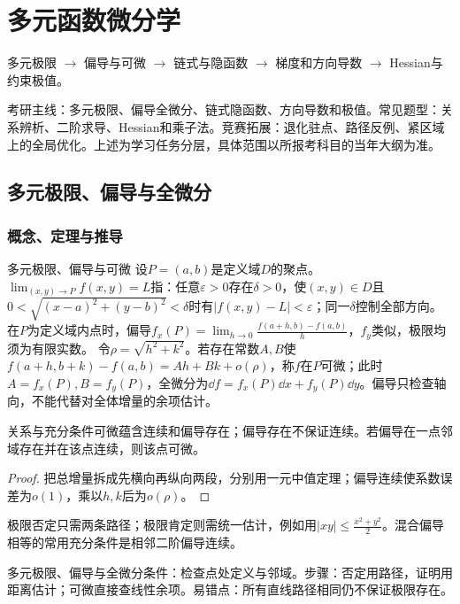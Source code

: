 \chapter{多元函数微分学}\label{ch:6}
\begin{tcolorbox}[title=章首知识地图,colframe=Ink]
多元极限 $\to$ 偏导与可微 $\to$ 链式与隐函数 $\to$ 梯度和方向导数 $\to$ Hessian与约束极值。
\end{tcolorbox}
\begin{examtip}考研主线：多元极限、偏导全微分、链式隐函数、方向导数和极值。常见题型：关系辨析、二阶求导、Hessian和乘子法。竞赛拓展：退化驻点、路径反例、紧区域上的全局优化。上述为学习任务分层，具体范围以所报考科目的当年大纲为准。\end{examtip}
\section{多元极限、偏导与全微分}\label{sec:6:1}
\subsection{概念、定理与推导}

\begin{definition}{多元极限、偏导与可微}
设$P=(a,b)$是定义域$D$的聚点。$\lim_{(x,y)\to P}f(x,y)=L$指：任意$\varepsilon>0$存在$\delta>0$，使$(x,y)\in D$且$0<\sqrt{(x-a)^2+(y-b)^2}<\delta$时有$|f(x,y)-L|<\varepsilon$；同一$\delta$控制全部方向。
在$P$为定义域内点时，偏导$f_x(P)=\lim_{h\to0}\frac{f(a+h,b)-f(a,b)}{h}$，$f_y$类似，极限均须为有限实数。
令$\rho=\sqrt{h^2+k^2}$。若存在常数$A,B$使
$f(a+h,b+k)-f(a,b)=Ah+Bk+o(\rho)$，称$f$在$P$可微；此时$A=f_x(P),B=f_y(P)$，全微分为$\dd f=f_x(P)\dd x+f_y(P)\dd y$。偏导只检查轴向，不能代替对全体增量的余项估计。
\end{definition}
\begin{theorem}{关系与充分条件}可微蕴含连续和偏导存在；偏导存在不保证连续。若偏导在一点邻域存在并在该点连续，则该点可微。\end{theorem}
\begin{proof}把总增量拆成先横向再纵向两段，分别用一元中值定理；偏导连续使系数误差为$o(1)$，乘以$h,k$后为$o(\rho)$。\end{proof}
极限否定只需两条路径；极限肯定则需统一估计，例如用$|xy|\le\frac{x^2+y^2}{2}$。混合偏导相等的常用充分条件是相邻二阶偏导连续。

\begin{method}{多元极限、偏导与全微分}条件：检查点处定义与邻域。步骤：否定用路径，证明用距离估计；可微直接查线性余项。易错点：所有直线路径相同仍不保证极限存在。\end{method}
